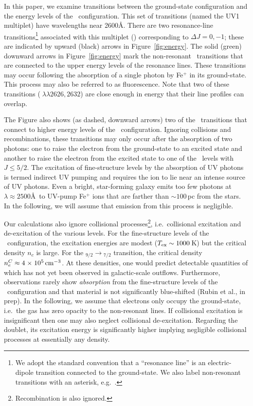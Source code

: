 \documentclass[12pt,preprint]{aastex}
\begin{document}
In this paper, we examine transitions between the ground-state
configuration and the energy levels of the \zconfig\
configuration.  This set of transitions (named the
UV1 multiplet) have wavelengths near 2600\AA.
There are two resonance-line transitions\footnote{We adopt the
  standard convention that a ``resonance line'' is an electric-dipole
  transition connected to the ground-state.  We also label
  non-resonant transitions with an asterisk, e.g.\ \feiic.} 
associated with this multiplet (\feiid)
corresponding to $\Delta J = 0, -1$; these are indicated by upward (black) arrows
in Figure~\ref{fig:energy}. The solid (green) downward
arrows in Figure~\ref{fig:energy} mark the non-resonant \feiis\
transitions that are connected to
the upper energy levels of the resonance lines.  These transitions may
occur following the absorption of a single photon by Fe$^+$ in its
ground-state.   This process may also be referred to as fluorescence.
Note that two of these transitions (\feiis$\; \lambda\lambda 2626, 2632$) are
close enough in energy that their line profiles can overlap.

The Figure also shows (as dashed, downward arrows) two of the
\feiis\ transitions that connect to higher energy levels of the \zconfig\
configuration.  Ignoring collisions and recombinations, these
transitions may only occur after the absorption
of two photons: one to raise the electron from the ground-state to an
excited state and another to raise the electron from the excited state
to one of the \zconfig\ levels with $J \le 5/2$.  The excitation of
fine-structure levels by 
the absorption of UV photons is termed indirect UV pumping
\citep[e.g][]{silva02,pcb06} and requires the ion to lie
near an intense source of UV photons.  
Even a bright, star-forming galaxy emits too few photons at $\lambda
\approx 2500$\AA\ to UV-pump Fe$^+$ ions that are farther than $\sim
100$\,pc from the stars.
In the
following, we will assume that emission from this process is
negligible.

Our calculations also ignore collisional
processes\footnote{Recombination is also ignored.}, i.e.\ collisional
excitation and de-excitation of the various levels.  For the
fine-structure levels of the \aconfig\ configuration, the excitation
energies are modest ($T_{\rm ex} \sim 1000$\,K) but the critical
density $n_c$ is large.  For the \aconfig$_{9/2} \to
$\aconfig$_{7/2}$ transition, the critical density $n_e^C \approx 4
{\; \times \; 10^{5}} \, {\rm cm^{-3}}$.  At these densities, one would predict  
detectable quantities of \ion{Fe}{1} which has not yet been observed
in galactic-scale outflows. Furthermore, observations rarely show
{\it absorption} from the
fine-structure levels of the \aconfig\ configuration and that material
is not significantly blue-shifted (Rubin et al., in prep). 
In the following, we assume that electrons only occupy the
ground-state, i.e.\ the gas has zero opacity to the non-resonant
lines.  If collisional excitation is insignificant 
then one may also neglect collisional de-excitation.  
Regarding the \ion{Mg}{2} doublet, its
excitation energy is significantly higher implying 
negligible collisional processes at essentially any density.
\end{document}

